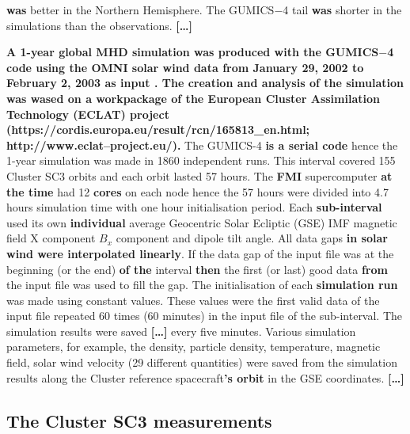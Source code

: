 \documentclass[linenumbers,draft]{agujournal}
\begin{document}
\textbf{was} better in the Northern Hemisphere. The GUMICS$-$4 tail \textbf{was} shorter in the simulations than the observations. \textbf{[\dots]}

\textbf{A 1-year global MHD simulation was produced with the GUMICS$-$4 code using the OMNI solar wind data from January 29, 2002 to February 2, 2003 as input \citep{facsko16:_one_earth}. The creation and analysis of the simulation was wased on a workpackage of the European Cluster Assimilation Technology (ECLAT) project (https://cordis.europa.eu/result/rcn/165813\_en.html; http://www.eclat--project.eu/).} The GUMICS-4 \textbf{is a serial code} \citep{janhunen12:_gumic_mhd} hence the 1-year simulation was made in 1860 independent runs. This interval covered 155 Cluster SC3 orbits and each orbit lasted 57 hours. The \textbf{FMI} supercomputer \textbf{at the time} had 12 \textbf{cores} on each node hence the 57 hours were divided into 4.7 hours simulation time with one hour initialisation period. Each \textbf{sub-interval} used its own \textbf{individual} average Geocentric Solar Ecliptic (GSE) IMF magnetic field X component $B_x$ component and dipole tilt angle. All data gaps \textbf{in solar wind were interpolated linearly}. If the data gap of the input file was at the beginning (or the end) \textbf{of the} interval \textbf{then} the first (or last) good data \textbf{from} the input file was used to fill the gap. The initialisation of each \textbf{simulation run} was made using constant values. These values were the first valid data of the input file repeated 60 times (60 minutes) in the input file of the sub-interval. The simulation results were saved \textbf{[\dots]} every five minutes. Various simulation parameters, for example, the density, particle density, temperature, magnetic field, solar wind velocity (29 different quantities) were saved from the simulation results along the Cluster reference spacecraft\textbf{'s orbit} in the GSE coordinates. \textbf{[\dots]}

\subsection{The Cluster SC3 measurements}
\label{sec:cluster}
\end{document}
